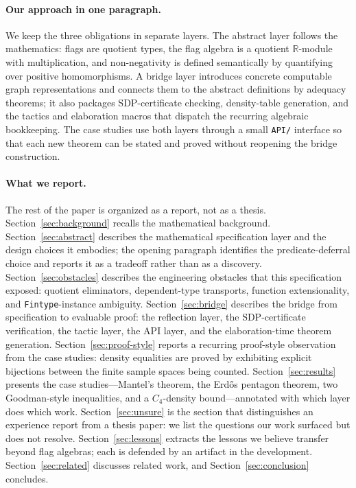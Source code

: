 \documentclass{article}
\newcommand{\lean}[1]{\texttt{#1}}
\begin{document}
\paragraph{Our approach in one paragraph.}
We keep the three obligations in separate layers.  The abstract layer follows
the mathematics: flags are quotient types, the flag algebra is a quotient
$\mathbb{R}$-module with multiplication, and non-negativity is defined
semantically by quantifying over positive homomorphisms.  A bridge layer
introduces concrete computable graph representations and connects them to the
abstract definitions by adequacy theorems; it also packages SDP-certificate
checking, density-table generation, and the tactics and elaboration macros
that dispatch the recurring algebraic bookkeeping.  The case studies use both
layers through a small \texttt{API/} interface so that each new theorem can be
stated and proved without reopening the bridge construction.

\paragraph{What we report.}
The rest of the paper is organized as a report, not as a thesis.
Section~\ref{sec:background} recalls the mathematical background.
Section~\ref{sec:abstract} describes the mathematical specification layer
and the design choices it embodies; the opening paragraph identifies the
predicate-deferral choice and reports it as a tradeoff rather than as a
discovery.
Section~\ref{sec:obstacles} describes the engineering obstacles that this
specification exposed: quotient eliminators, dependent-type transports,
function extensionality, and \lean{Fintype}-instance ambiguity.
Section~\ref{sec:bridge} describes the bridge from specification to evaluable
proof: the reflection layer, the SDP-certificate verification, the tactic
layer, the API layer, and the elaboration-time theorem generation.
Section~\ref{sec:proof-style} reports a recurring proof-style observation
from the case studies: density equalities are proved by exhibiting explicit
bijections between the finite sample spaces being counted.
Section~\ref{sec:results} presents the case studies---Mantel's theorem, the
Erd\H{o}s pentagon theorem, two Goodman-style inequalities, and a
$C_4$-density bound---annotated with which layer does which work.
Section~\ref{sec:unsure} is the section that distinguishes an experience
report from a thesis paper: we list the questions our work surfaced but does
not resolve.  Section~\ref{sec:lessons} extracts the lessons we believe
transfer beyond flag algebras; each is defended by an artifact in the
development.  Section~\ref{sec:related} discusses related work, and
Section~\ref{sec:conclusion} concludes.
\end{document}
